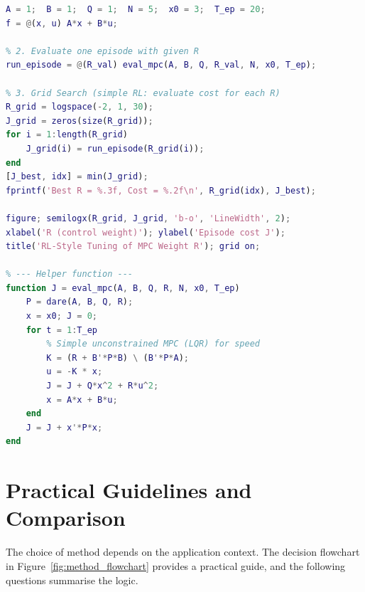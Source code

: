 \begin{lstlisting}[language=Matlab, caption={RL-style tuning of MPC weight $R$ on a scalar system.}]
% 1. System
A = 1;  B = 1;  Q = 1;  N = 5;  x0 = 3;  T_ep = 20;
f = @(x, u) A*x + B*u;

% 2. Evaluate one episode with given R
run_episode = @(R_val) eval_mpc(A, B, Q, R_val, N, x0, T_ep);

% 3. Grid Search (simple RL: evaluate cost for each R)
R_grid = logspace(-2, 1, 30);
J_grid = zeros(size(R_grid));
for i = 1:length(R_grid)
    J_grid(i) = run_episode(R_grid(i));
end
[J_best, idx] = min(J_grid);
fprintf('Best R = %.3f, Cost = %.2f\n', R_grid(idx), J_best);

figure; semilogx(R_grid, J_grid, 'b-o', 'LineWidth', 2);
xlabel('R (control weight)'); ylabel('Episode cost J');
title('RL-Style Tuning of MPC Weight R'); grid on;

% --- Helper function ---
function J = eval_mpc(A, B, Q, R, N, x0, T_ep)
    P = dare(A, B, Q, R);
    x = x0; J = 0;
    for t = 1:T_ep
        % Simple unconstrained MPC (LQR) for speed
        K = (R + B'*P*B) \ (B'*P*A);
        u = -K * x;
        J = J + Q*x^2 + R*u^2;
        x = A*x + B*u;
    end
    J = J + x'*P*x;
end
\end{lstlisting}


\section{Practical Guidelines and Comparison}
\label{sec:comparison}

The choice of method depends on the application context. The decision flowchart in Figure~\ref{fig:method_flowchart} provides a practical guide, and the following questions summarise the logic.

